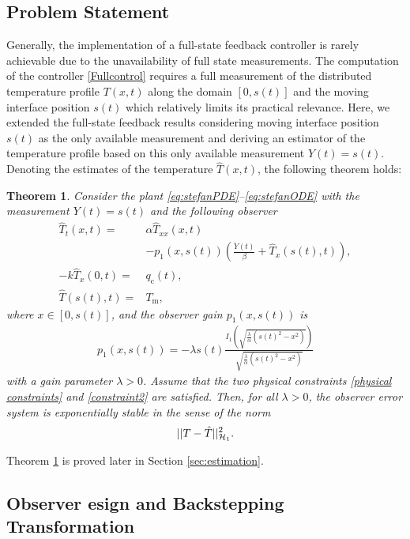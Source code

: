 \documentclass[journal]{IEEEtran}
\newtheorem{thm}{Theorem}
\begin{document}
\subsection{ Problem Statement }\label{statement}
Generally, the implementation of a full-state feedback controller  is rarely achievable  due to the unavailability of full state measurements. The computation of the controller \eqref{Fullcontrol} requires  a full measurement  of the distributed   temperature profile $T(x,t)$ along the domain $[0, s(t)]$  and the moving interface position $s(t)$ which relatively limits its   practical relevance. Here, we extended the full-state feedback results considering  moving interface position $s(t)$ as the only available measurement and deriving an estimator of the temperature profile based on this only available measurement  $Y(t)=s(t)$. Denoting the estimates of the temperature $\hat T(x,t)$, the following theorem holds:
\begin{thm}\label {observer}
Consider the plant \eqref{eq:stefanPDE}--\eqref{eq:stefanODE} with the measurement $Y(t)=s(t)$ and the following observer 
\begin{align}
 \label{observerPDE}\hat{T}_t(x,t)=&\alpha \hat{T}_{xx}(x,t) \nonumber\\
 & - p_1(x,s(t))\left(\frac{\dot{Y}(t)}{\beta} + \hat{T}_x(s(t),t)\right),  \\
 \label{observerBC2}-k\hat{T}_x(0,t)=&q_{{\mathrm c}}(t), \\
\label{observerBC1}\hat{T}(s(t),t)=&T_{{\mathrm m}}, 
\end{align}
where $x\in[0,s(t)]$, and the observer gain $p_1(x,s(t))$ is 
\begin{align}\label{P1x}
p_1(x,s(t)) =  -\lambda s(t)\frac{I_1\left(\sqrt{\frac{\lambda}{\alpha}\left(s(t)^2-x^2\right)}\right)}{\sqrt{\frac{\lambda}{\alpha} \left(s(t)^2-x^2\right)}}
\end{align}
with a gain parameter $\lambda>0 $. Assume that the two physical constraints \eqref{physical constraints} and \eqref{constraint2} are satisfied. Then, for all  $\lambda >0$, the observer error system is exponentially stable in the sense of the norm 
\begin{align}
||T-\hat{T}||_{{\cal H}_1}^2 . 
\end{align}
\end{thm}
Theorem \ref{observer} is proved later in  Section \ref{sec:estimation}. 

\subsection{Observer esign and Backstepping Transformation  }\label{obsvtarget}
\end{document}
